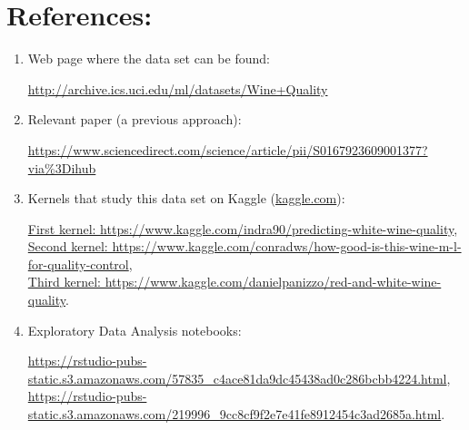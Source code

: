 \documentclass[10pt]{article}
\begin{document}
\section{References:}
\begin{enumerate}
  \item Web page where the data set can be found:

  \href{http://archive.ics.uci.edu/ml/datasets/Wine+Quality}{ http://archive.ics.uci.edu/ml/datasets/Wine+Quality}

  \item Relevant paper (a previous approach):

  \href{https://www.sciencedirect.com/science/article/pii/S0167923609001377?via\%3Dihub}{ https://www.sciencedirect.com/science/article/pii/S0167923609001377?via\%3Dihub}

  \item Kernels that study this data set on Kaggle (\href{www.kaggle.com}{kaggle.com}):

  \href{https://www.kaggle.com/indra90/predicting-white-wine-quality}{First kernel: https://www.kaggle.com/indra90/predicting-white-wine-quality},\\
  \href{https://www.kaggle.com/conradws/how-good-is-this-wine-m-l-for-quality-control}{Second kernel: https://www.kaggle.com/conradws/how-good-is-this-wine-m-l-for-quality-control},\\
  \href{https://www.kaggle.com/danielpanizzo/red-and-white-wine-quality}{Third kernel: https://www.kaggle.com/danielpanizzo/red-and-white-wine-quality}.

  \item Exploratory Data Analysis notebooks:

  \href{https://rstudio-pubs-static.s3.amazonaws.com/57835\_c4ace81da9dc45438ad0c286bcbb4224.html}{ https://rstudio-pubs-static.s3.amazonaws.com/57835\_c4ace81da9dc45438ad0c286bcbb4224.html},\\
  \href{https://rstudio-pubs-static.s3.amazonaws.com/219996\_9cc8cf9f2e7e41fe8912454c3ad2685a.html}{ https://rstudio-pubs-static.s3.amazonaws.com/219996\_9cc8cf9f2e7e41fe8912454c3ad2685a.html}.



\end{enumerate}
\end{document}
